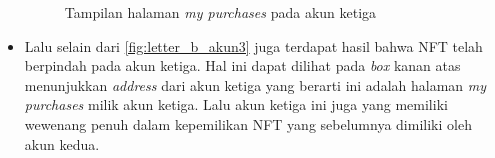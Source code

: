 \begin{itemize}
    \begin{figure} [H] \centering
      \caption{Tampilan halaman \emph{my purchases} pada akun ketiga}
      \label{fig:akunketiga}
      \end{figure}

    \item Lalu selain dari \ref*{fig:letter_b_akun3} juga terdapat hasil bahwa NFT telah berpindah pada akun ketiga. Hal ini dapat dilihat pada \emph{box} kanan atas menunjukkan \emph{address} dari akun ketiga yang berarti ini adalah halaman \emph{my purchases} milik akun ketiga. Lalu akun ketiga ini juga yang memiliki wewenang penuh dalam kepemilikan NFT yang sebelumnya dimiliki oleh akun kedua.
    

\end{itemize}
